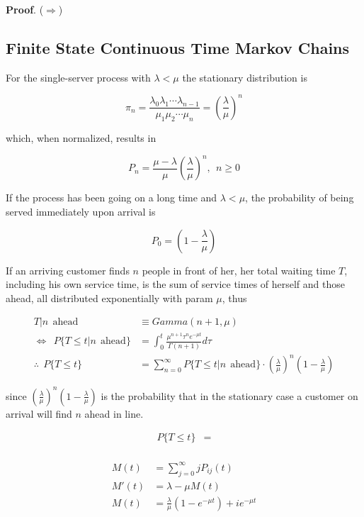 \documentclass[12pt]{article}
\theoremstyle{nonumberbreak}
\begin{document}
\textbf{Proof}. ($\Rightarrow$) 



\subsection{Finite State Continuous Time Markov Chains}






For the single-server process with $\lambda < \mu$ the stationary distribution is 

$$
\pi_n = \frac{\lambda_0 \lambda_1 \cdots \lambda_{n-1} }{\mu_1 \mu_2 \cdots \mu_n} = (\frac{\lambda}{\mu})^n
$$

which, when normalized, results in

$$
P_n = \frac{\mu - \lambda}{\mu} (\frac{\lambda}{\mu})^n, \ \ n \ge 0
$$


If the process has been going on a long time and $\lambda < \mu$, the probability of being served immediately upon arrival is 

$$
P_0 = (1 - \frac{\lambda}{\mu})
$$


If an arriving customer finds $n$ people in front of her, her total waiting time $T$, including his own service time, is the sum of service times of herself and those ahead, all distributed exponentially with param $\mu$, thus 

$$
\begin{aligned}
T | n \ \ \mathrm{ahead} &\equiv Gamma(n+1, \mu) \\[8pt]
\Leftrightarrow \ \ P \{ T \le t | n \ \ \mathrm{ahead}  \} &= \int_0^t \frac{\mu^{n+1} \tau^n e^{-\mu t} }{\Gamma(n+1)} d\tau \\[10pt]
\therefore \ \ P \{ T \le t\} &= \sum_{n=0}^\infty P \{ T \le t | n \ \ \mathrm{ahead} \} \cdot (\frac{\lambda}{\mu})^n (1 - \frac{\lambda}{\mu})
\end{aligned}
$$  

since $(\frac{\lambda}{\mu})^n (1 - \frac{\lambda}{\mu})$ is the probability that in the stationary case a customer on arrival will find $n$ ahead in line. 


$$
\begin{aligned}
P \{ T \le t\} &= \\[8pt]
\end{aligned}
$$



$$
\begin{aligned}
M(t) &= \sum_{j=0}^\infty j P_{ij}(t) \\[8pt]
M'(t) &= \lambda - \mu M(t) \\[8pt]
M(t) &= \frac{\lambda}{\mu} (1 - e^{-\mu t}) + i e^{-\mu t} \\[8pt]
\end{aligned}
$$
\end{document}
